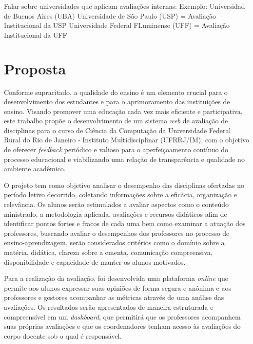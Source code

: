 Falar sobre universidades que aplicam avaliações internas:
 Exemplo: 
 Universidad de Buenos Aires (UBA)
 Universidade de São Paulo (USP) = Avaliação Institucional da USP
     Universidade Federal FLuminense (UFF) = Avaliação Institucional da UFF

\section{Proposta}
\label{sec:proposta}

Conforme supracitado, a qualidade do ensino é um elemento crucial para o desenvolvimento dos estudantes e para o aprimoramento das instituições de ensino. Visando promover uma educação cada vez mais eficiente e participativa, este trabalho propõe o desenvolvimento de um sistema \textit{web} de avaliação de disciplinas para o curso de Ciência da Computação da Universidade Federal Rural do Rio de Janeiro - Instituto Multidisciplinar (UFRRJ/IM), com o objetivo de oferecer \textit{feedback} periódico e valioso para o aperfeiçoamento contínuo do processo educacional e viabilizando uma relação de transparência e qualidade no ambiente acadêmico.


O projeto tem como objetivo analisar o desempenho das disciplinas ofertadas no período letivo decorrido, coletando informações sobre a eficácia, organização e relevância. Os alunos serão estimulados a avaliar aspectos como o conteúdo ministrado, a metodologia aplicada, avaliações e recursos didáticos afim de identificar pontos fortes e fracos de cada uma bem como examinar a atuação dos professores, buscando avaliar o desempenhos dos professores no processo de ensino-aprendizagem, serão considerados critérios como o domínio sobre a matéria, didática, clareza sobre a ementa, comunicação compreensiva, disponibilidade e capacidade de manter os alunos motivados.


Para a realização da avaliação, foi desenvolvida uma plataforma \textit{online} que permite aos alunos expressar suas opiniões de forma segura e anônima e aos professores e gestores acompanhar as métricas através de uma análise das avaliações. Os resultados serão apresentados de maneira estruturada e compreensível em um \textit{dashboard}, que permitirá que os professores acompanhem suas próprias avaliações e que os coordenadores tenham acesso às avaliações do corpo docente sob o qual é responsável.

